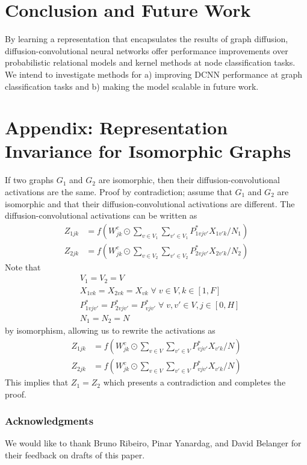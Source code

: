 \documentclass{article}
\begin{document}
\section{Conclusion and Future Work}
\label{sec:conclusion}
By learning a representation that encapsulates the results of graph diffusion, diffusion-convolutional neural networks offer performance improvements over probabilistic relational models and kernel methods at node classification tasks.  We intend to investigate methods for a) improving DCNN performance at graph classification tasks and b) making the model scalable in future work.


\section{Appendix: Representation Invariance for Isomorphic Graphs}
\label{sec:appendix}
If two graphs $G_1$ and $G_2$ are isomorphic, then their diffusion-convolutional activations are the same.  Proof by contradiction; assume that $G_1$ and $G_2$ are isomorphic and that their diffusion-convolutional activations are different.  The diffusion-convolutional activations can be written as
\begin{align*}
Z_{1jk} &= f\left(W^c_{jk} \odot \sum\limits_{v \in V_1} \sum\limits_{v' \in V_1} P^{*}_{1vjv'} X_{1v'k} / N_1\right) \\
Z_{2jk} &= f\left(W^c_{jk} \odot \sum\limits_{v \in V_2} \sum\limits_{v' \in V_2} P^{*}_{2vjv'} X_{2v'k} / N_2\right)
\end{align*}
Note that
\begin{align*}
    &V_1 = V_2 = V \\
    &X_{1vk} = X_{2vk} = X_{vk} \;\forall\; v \in V, k \in \left[1,F\right] \\
    &P^{*}_{1vjv'} = P^{*}_{2vjv'} = P^{*}_{vjv'} \; \forall \; v,v' \in V, j \in \left[0,H\right] \\
    &N_1 = N_2 = N 
\end{align*}
by isomorphism, allowing us to rewrite the activations as
\begin{align*}
Z_{1jk} &= f\left(W^c_{jk} \odot \sum\limits_{v \in V} \sum\limits_{v' \in V} P^{*}_{vjv'} X_{v'k} / N\right) \\
Z_{2jk} &= f\left(W^c_{jk} \odot \sum\limits_{v \in V} \sum\limits_{v' \in V} P^{*}_{vjv'} X_{v'k} / N\right)
\end{align*}
This implies that $Z_1 = Z_2$ which presents a contradiction and completes the proof.

\subsubsection*{Acknowledgments}
We would like to thank Bruno Ribeiro, Pinar Yanardag, and David Belanger for their feedback on drafts of this paper.  



\end{document}
